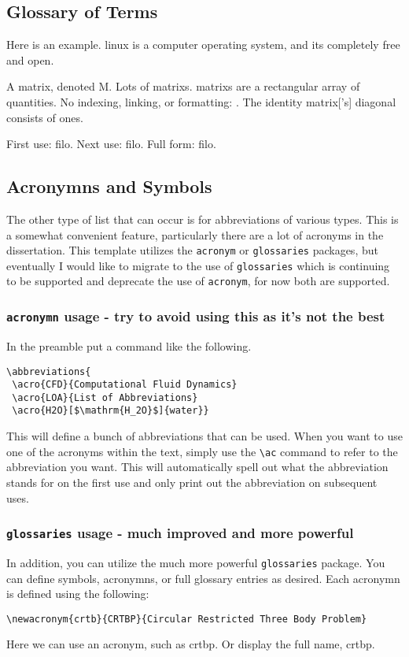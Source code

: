 \subsection{Glossary of Terms}\label{ssec:glossary}
Here is an example.
\Gls{linux} is a computer operating system, and its completely free and open.

A \gls{matrix}, denoted \gls{M}.
Lots of \glspl{matrix}.
\Glspl{matrix} are a rectangular array of quantities.
No indexing, linking, or formatting: .
The identity \gls{matrix}['s] diagonal consists of ones.

First use: \gls{filo}.
Next use: \gls{filo}.
Full form: \acrfull{filo}.


\subsection{Acronymns and Symbols}\label{ssec:acronymns}
The other type of list that can occur is for abbreviations of various types.  
This is a somewhat convenient feature, particularly there are a lot of acronyms in the dissertation.  
This template utilizes the \texttt{acronym} or \texttt{glossaries} packages, but eventually I would like to migrate to the use of \texttt{glossaries} which is continuing to be supported and deprecate the use of \texttt{acronym}, for now both are supported. 

\subsubsection{\texttt{acronymn} usage - try to avoid using this as it's not the best}
In the preamble put a command like the following.
\begin{verbatim}
\abbreviations{
 \acro{CFD}{Computational Fluid Dynamics}
 \acro{LOA}{List of Abbreviations}
 \acro{H2O}[$\mathrm{H_2O}$]{water}}
\end{verbatim}
This will define a bunch of abbreviations that can be used.  
When you want to use one of the acronyms within the text, simply use the \verb|\ac| command to refer to the abbreviation you want.  
This will automatically spell out what the abbreviation stands for on the first use and only print out the abbreviation on subsequent uses.  

\subsubsection{\texttt{glossaries} usage - much improved and more powerful}
In addition, you can utilize the much more powerful \texttt{glossaries} package.
You can define symbols, acronymns, or full glossary entries as desired.
Each acronymn is defined using the following:
\begin{verbatim}
\newacronym{crtb}{CRTBP}{Circular Restricted Three Body Problem}
\end{verbatim}
Here we can  use an acronym, such as \gls{crtbp}.
Or display the full name, \gls{crtbp}.

